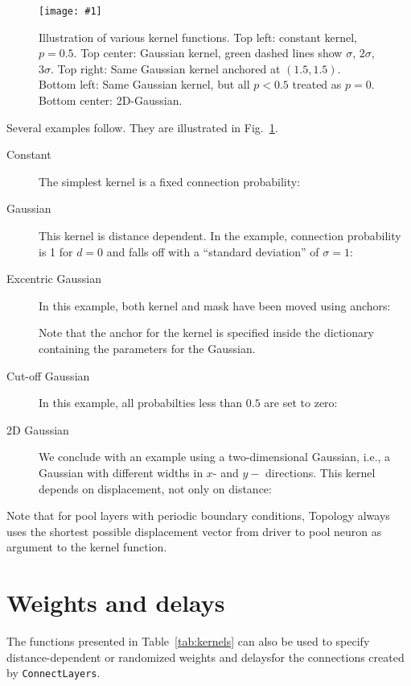 \documentclass[a4paper,12pt]{report}
\newcommand{\scriptfig}[4]{%
\begin{figure}
\centerline{\texttt{[image: \#1]}}
\caption[#3]{#4}
\label{fig:#1}
\end{figure}%
}
\begin{document}
\scriptfig{conn4}{0.9}{Kernel functions}%
{Illustration of various kernel functions. Top left: constant kernel,
  $p=0.5$. Top center: Gaussian kernel, green dashed lines show
  $\sigma$, $2\sigma$, $3\sigma$. Top right: Same Gaussian kernel
  anchored at $(1.5,1.5)$. Bottom left: Same Gaussian kernel, but all
  $p<0.5$ treated as $p=0$. Bottom center: 2D-Gaussian.}

Several examples follow. They are illustrated in Fig.~\ref{fig:conn4}.
\begin{description}
\item[Constant] The simplest kernel is a fixed connection
  probability:

\item[Gaussian] This kernel is distance dependent. In the example,
  connection probability is 1 for $d=0$ and falls off with a
  ``standard deviation'' of $\sigma=1$:
 
\item[Excentric Gaussian] In this example, both kernel and mask have
  been moved using anchors:
 
Note that the anchor for the kernel is specified inside the dictionary
containing the parameters for the Gaussian.
\item[Cut-off Gaussian] In this example, all probabilties less than
  $0.5$ are set to zero:
 
\item[2D Gaussian] We conclude with an
  example using a two-dimensional Gaussian, i.e., a Gaussian with
  different widths in $x$- and $y-$ directions. This kernel depends on
  displacement, not only on distance:
 
\end{description}
Note that for pool layers with periodic boundary conditions, Topology
always uses the shortest possible displacement vector from driver
to pool neuron as argument to the kernel function.


\section{Weights and delays}\label{sec:conn_wd}

The functions presented in Table~\ref{tab:kernels} can also be used to
specify distance-dependent or randomized weights and delaysfor the connections
created by \lstinline!ConnectLayers!.
\end{document}
